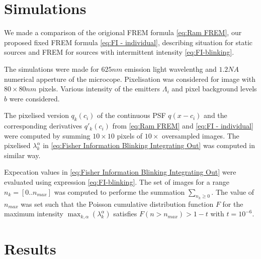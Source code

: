 
\section{Simulations\label{sec:FREM simulations}} 
We made a comparison of the origional FREM formula \autoref{eq:Ram FREM}, our proposed fixed FREM formula \autoref{eq:FI - individual}, describing situation for static sources and FREM for sources with intermittent intensity \autoref{eq:FI-blinking}.

The simulations were made for $625\unit{nm}$ emission light wavelenthg and $1.2\unit{NA}$ numerical apperture of the microcope. Pixelisation was considered for image with $80\times80\unit{nm}$ pixels. Various intensity of the emitters $\Lambda_i$ and pixel background levels $b$ were considered.

The pixelised version $q_k(c_i)$ of the continuous PSF $q(x-c_i)$ and the corresponding derivatives $q'_k(c_i)$ from \autoref{eq:Ram FREM} and \autoref{eq:FI - individual} were computed by summing $10\times10$ pixels of $10\times$ oversampled images. The pixelised $\lambda^\alpha_k$ in \autoref{eq:Fisher Information Blinking Integrating Out} was computed in similar way. 

Expecation values in \autoref{eq:Fisher Information Blinking Integrating Out} were evaluated using expression \autoref{eq:FI-blinking}. The set of images for a range $n_k=[0..n_{max}]$ was computed to performe the summation $\sum_{n_k\geq0}$. The value of $n_{max}$ was set such that the Poisson cumulative distribution function $F$ for the maximum intensity $\max_{k,\alpha}(\lambda_k^\alpha)$ satisfies $F(n>n_{max})>1-t$ with $t=10^{-6}$. 


\section{Results\label{sec:FREM results}}

